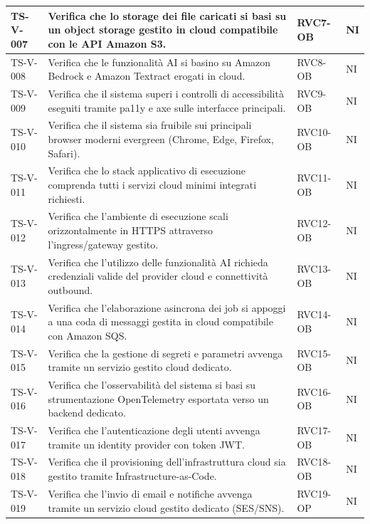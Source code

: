 \documentclass[a4paper,12pt]{article}
\begin{document}
\begin{longtable}{|p{2.2cm}|p{9.5cm}|p{2.3cm}|p{1.5cm}|}
    TS-V-007 & Verifica che lo storage dei file caricati si basi su un object storage gestito in cloud compatibile con le API Amazon S3. & RVC7-OB & NI \\
    \hline
    TS-V-008 & Verifica che le funzionalità AI si basino su Amazon Bedrock e Amazon Textract erogati in cloud. & RVC8-OB & NI \\
    \hline
    TS-V-009 & Verifica che il sistema superi i controlli di accessibilità eseguiti tramite pa11y e axe sulle interfacce principali. & RVC9-OB & NI \\
    \hline
    TS-V-010 & Verifica che il sistema sia fruibile sui principali browser moderni evergreen (Chrome, Edge, Firefox, Safari). & RVC10-OB & NI \\
    \hline
    TS-V-011 & Verifica che lo stack applicativo di esecuzione comprenda tutti i servizi cloud minimi integrati richiesti. & RVC11-OB & NI \\
    \hline
    TS-V-012 & Verifica che l'ambiente di esecuzione scali orizzontalmente in HTTPS attraverso l'ingress/gateway gestito. & RVC12-OB & NI \\
    \hline
    TS-V-013 & Verifica che l'utilizzo delle funzionalità AI richieda credenziali valide del provider cloud e connettività outbound. & RVC13-OB & NI \\
    \hline
    TS-V-014 & Verifica che l'elaborazione asincrona dei job si appoggi a una coda di messaggi gestita in cloud compatibile con Amazon SQS. & RVC14-OB & NI \\
    \hline
    TS-V-015 & Verifica che la gestione di segreti e parametri avvenga tramite un servizio gestito cloud dedicato. & RVC15-OB & NI \\
    \hline
    TS-V-016 & Verifica che l'osservabilità del sistema si basi su strumentazione OpenTelemetry esportata verso un backend dedicato. & RVC16-OB & NI \\
    \hline
    TS-V-017 & Verifica che l'autenticazione degli utenti avvenga tramite un identity provider con token JWT. & RVC17-OB & NI \\
    \hline
    TS-V-018 & Verifica che il provisioning dell'infrastruttura cloud sia gestito tramite Infrastructure-as-Code. & RVC18-OB & NI \\
    \hline
    TS-V-019 & Verifica che l'invio di email e notifiche avvenga tramite un servizio cloud gestito dedicato (SES/SNS). & RVC19-OP & NI \\
    \hline
\end{longtable}
\end{document}
